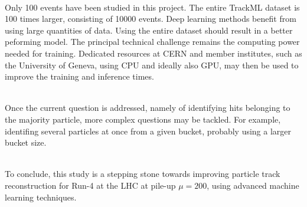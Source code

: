 \ \\Only 100 events have been studied in this project. The entire TrackML dataset is 100 times larger, consisting of 10000 events. Deep learning methods benefit from using large quantities of data. Using the entire dataset should result in a better peforming model. The principal technical challenge remains the computing power needed for training. Dedicated resources at CERN and member institutes, such as the University of Geneva, using CPU and ideally also GPU, may then be used to improve the training and inference times.

\ \\Once the current question is addressed, namely of identifying hits belonging to the majority particle, more complex questions may be tackled. For example, identifing several particles at once from a given bucket, probably using a larger bucket size.

\ \\To conclude, this study is a stepping stone towards improving particle track reconstruction for Run-4 at the LHC at pile-up $\mu=200$, using advanced machine learning techniques.
